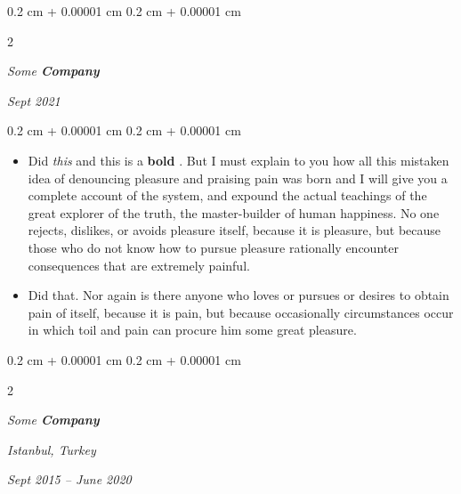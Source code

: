 \documentclass[10pt, letterpaper]{article}
\newenvironment{highlights}{
    \begin{itemize}[
        topsep=0.10 cm,
        parsep=0.10 cm,
        partopsep=0pt,
        itemsep=0pt,
        leftmargin=0.4 cm + 10pt
    ]
}{
    \end{itemize}
} %
\newenvironment{onecolentry}{
    \begin{adjustwidth}{
        0.2 cm + 0.00001 cm
    }{
        0.2 cm + 0.00001 cm
    }
}{
    \end{adjustwidth}
} %
\newenvironment{twocolentry}[2][]{
    \onecolentry
    \def\secondColumn{#2}
    \setcolumnwidth{\fill, 4.5 cm}
    \begin{paracol}{2}
}{
    \switchcolumn \raggedleft \secondColumn
    \end{paracol}
    \endonecolentry
} %
\let\hrefWithoutArrow\href
\renewcommand{\href}[2]{\hrefWithoutArrow{#1}{\ifthenelse{\equal{#2}{}}{ }{#2 }\raisebox{.15ex}{\footnotesize \faExternalLink*}}}
\begin{document}
        \vspace{0.2 cm}

            \begin{twocolentry}{


        \textit{Sept 2021}    }
                \textbf{}

                \textit{Some \textbf{Company}}
            \end{twocolentry}

        \vspace{0.10 cm}
        \begin{onecolentry}
            \begin{highlights}
                \item Did \textit{this} and this is a \textbf{bold} \href{https://example.com}{link}. But I must explain to you how all this mistaken idea of denouncing pleasure and praising pain was born and I will give you a complete account of the system, and expound the actual teachings of the great explorer of the truth, the master-builder of human happiness. No one rejects, dislikes, or avoids pleasure itself, because it is pleasure, but because those who do not know how to pursue pleasure rationally encounter consequences that are extremely painful.
                \item Did that. Nor again is there anyone who loves or pursues or desires to obtain pain of itself, because it is pain, but because occasionally circumstances occur in which toil and pain can procure him some great pleasure.
            \end{highlights}
        \end{onecolentry}


        \vspace{0.2 cm}

            \begin{twocolentry}{
        \textit{Istanbul, Turkey}

        \textit{Sept 2015 – June 2020}    }
                \textbf{}

                \textit{Some \textbf{Company}}
            \end{twocolentry}
\end{document}
